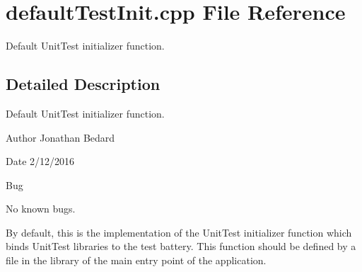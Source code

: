 \section{default\+Test\+Init.\+cpp File Reference}
\label{defaultTestInit_8cpp}


Default Unit\+Test initializer function.  




\subsection{Detailed Description}
Default Unit\+Test initializer function. 

\begin{DoxyAuthor}{Author}
Jonathan Bedard 
\end{DoxyAuthor}
\begin{DoxyDate}{Date}
2/12/2016 
\end{DoxyDate}
\begin{DoxyRefDesc}{Bug}
\item[{\bf Bug}]No known bugs.\end{DoxyRefDesc}


By default, this is the implementation of the Unit\+Test initializer function which binds Unit\+Test libraries to the test battery. This function should be defined by a file in the library of the main entry point of the application. 